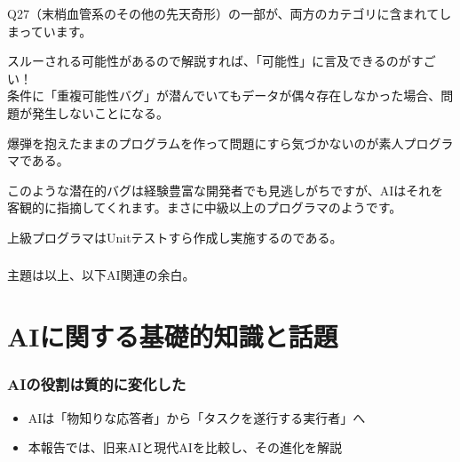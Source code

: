 \documentclass[uplatex,dvipdfmx,9pt,a4paper]{beamer}
\begin{document}
\begin{frame}
\begin{aichat}
\begin{scriptsize}
  Q27（末梢血管系のその他の先天奇形）の一部が、両方のカテゴリに含まれてしまっています。
  \end{scriptsize}
  \end{aichat}

  スルーされる可能性があるので解説すれば、「可能性」に言及できるのがすごい！\\

  条件に「重複可能性バグ」が潜んでいてもデータが偶々存在しなかった場合、問題が発生しないことになる。\\
  \vspace{0.5cm}

  爆弾を抱えたままのプログラムを作って問題にすら気づかないのが素人プログラマである。\\
  \vspace{0.5cm}

  このような潜在的バグは経験豊富な開発者でも見逃しがちですが、AIはそれを客観的に指摘してくれます。まさに中級以上のプログラマのようです。\\
  \vspace{0.5cm}

  上級プログラマはUnitテストすら作成し実施するのである。\\


\end{frame}

\begin{frame}%
  \frametitle{}

  \huge
  \begin{center}
    主題は以上、以下AI関連の余白。
  \end{center}

\end{frame}

\section{AIに関する基礎的知識と話題}

\begin{frame}%
  \frametitle{AIの役割は質的に変化した}
  \begin{itemize}
    \item AIは「物知りな応答者」から「タスクを遂行する実行者」へ
    \item 本報告では、旧来AIと現代AIを比較し、その進化を解説
  \end{itemize}
\end{frame}
\end{document}
